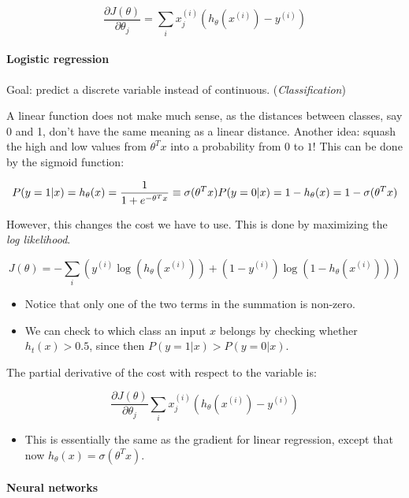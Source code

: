 \documentclass[]{article}
\let\oldparagraph\paragraph
\renewcommand{\paragraph}[1]{\oldparagraph{#1}\mbox{}}
\begin{document}
\[\frac{\partial J(\theta)}{\partial \theta_j} = \sum_{i} x_j^{(i)}\left( h_\theta(x^{(i)}) - y^{(i)}\right)\]

\paragraph{Logistic regression}\label{header-n300}

Goal: predict a discrete variable instead of continuous.
(\emph{Classification})

A linear function does not make much sense, as the distances between
classes, say 0 and 1, don't have the same meaning as a linear distance.
Another idea: squash the high and low values from \(\theta^T x\) into a
probability from \(0\) to \(1\)! This can be done by the sigmoid
function:

\[P(y=1|x) = h_\theta(x) = \frac 1 {1 + e^{-\theta^Tx}} \equiv \sigma(\theta^Tx) \\
P(y=0|x) =1- h_\theta(x) = 1-\sigma(\theta^Tx)\]

However, this changes the cost we have to use. This is done by
maximizing the \emph{log likelihood}.

\[J(\theta) = - \sum_i\left(y^{(i)}\log(h_\theta(x^{(i)})) + (1 - y^{(i)}) \log(1-h_\theta(x^{(i)}))\right)\]

\begin{itemize}
\item
  Notice that only one of the two terms in the summation is non-zero.
\item
  We can check to which class an input \(x\) belongs by checking whether
  \(h_t(x) > 0.5\), since then \(P(y=1 | x) > P(y=0 | x)\).
\end{itemize}

The partial derivative of the cost with respect to the variable is:

\[\frac{\partial J(\theta)}{\partial \theta_j} \sum_i x_j^{(i)}(h_\theta(x^{(i)})-y^{(i)})\]

\begin{itemize}
\item
  This is essentially the same as the gradient for linear regression,
  except that now \(h_\theta(x) = \sigma(\theta^Tx)\).
\end{itemize}

\paragraph{Neural networks}\label{header-n323}
\end{document}
